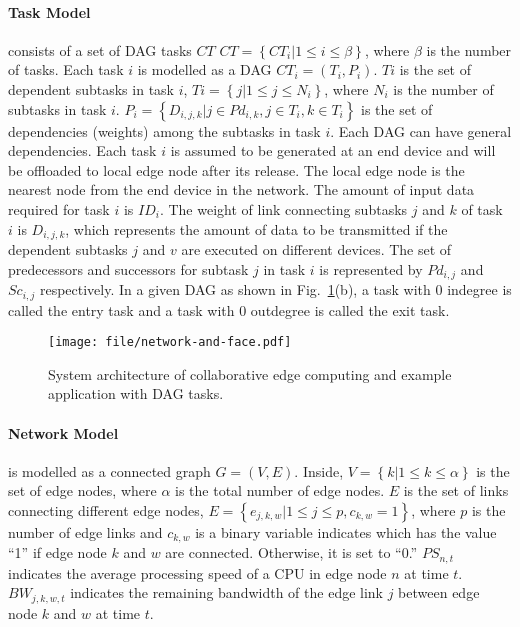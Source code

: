 \documentclass[10pt, conference, letterpaper]{IEEEtran}
\begin{document}
\paragraph{Task Model} consists of a set of DAG tasks $CT$ $ CT = \left\{CT_i | 1  \leq  i  \leq  \beta \right\}$, where $\beta$ is the number of tasks. Each task $i$ is modelled as a DAG $CT_i = (T_i, P_i)$. $Ti$ is the set of dependent subtasks in task $i$, $Ti = \left\{j | 1 \leq  j  \leq N_i \right\}$, where $N_i$ is the number of subtasks in task $i$. $P_i = \left\{D_{i,j,k} | j \in Pd_{i,k}, j \in T_i, k \in T_i \right\}$ is the set of dependencies (weights) among the subtasks in task $i$. Each DAG can have general dependencies. Each task $i$ is assumed to be generated at an end device and will be offloaded to local edge node after its release. The local edge node is the nearest node from the end device in the network. The amount of input data required for task $i$ is $ID_i$. The weight of link connecting subtasks $j$ and $k$ of task $i$ is $D_{i,j,k}$, which represents the amount of data to be transmitted if the dependent subtasks $j$ and $v$ are executed on different devices. The set of predecessors and successors for subtask $j$ in task $i$ is represented by $Pd_{i,j}$ and $Sc_{i,j}$ respectively. In a given DAG as shown in Fig.~\ref{fig:sys-arc-and-dag-example}(b), a task with $0$ indegree is called the entry task and a task with $0$ outdegree is called the exit task. 

\begin{figure}[t]
		\centering
        \texttt{[image: file/network-and-face.pdf]}
        \caption{System architecture of collaborative edge computing and example application with DAG tasks.}\label{fig:sys-arc-and-dag-example}
\end{figure}

\paragraph{Network Model} is modelled as a connected graph $G= (V,E)$. Inside, $V = \left\{k | 1  \leq  k  \leq  \alpha \right\}$ is the set of edge nodes, where $\alpha$ is the total number of edge nodes. $E$ is the set of links connecting different edge nodes, $E=\left\{e_{j,k,w} | 1  \leq  j \leq p, c_{k,w} = 1 \right\}$, where $p$ is the number of edge links and $c_{k,w}$ is a binary variable indicates which has the value ``1'' if edge node $k$ and $w$ are connected. Otherwise, it is set to ``0.'' $PS_{n,t}$ indicates the average processing speed of a CPU in edge node $n$ at time $t$. $BW_{j,k,w,t}$ indicates the remaining bandwidth of the edge link $j$ between edge node $k$ and $w$ at time $t$. 
\end{document}
